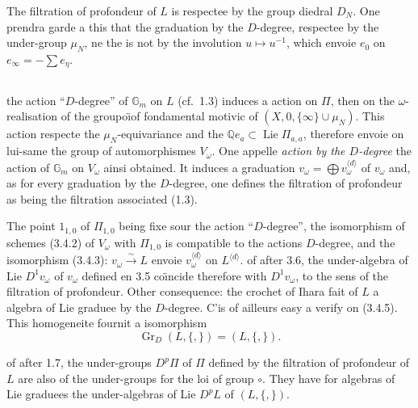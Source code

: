 \documentclass[11pt,a4paper]{article}
\theoremstyle{plain}
\theoremstyle{definition}
\DeclareMathOperator{\Lie}{Lie}
\newcommand{\Di}{D}
\newcommand{\Gm}{\mathbb{G}_m}
\newcommand{\Q}{\mathbb{Q}}
\newcommand{\Gr}{\operatorname{Gr}}
\begin{document}
The filtration of profondeur of $L$ is respectee by the group diedral $\Di_N$. One prendra garde a this that the graduation by the $D$-degree, respectee by the under-group $\mu_N$, ne the is not by the involution $u \mapsto u^{-1}$, which envoie $e_0$ on $e_\infty = -\sum e_\eta$.

\subsection{}
the action ``$D$-degree'' of $\Gm$ on $L$ (cf.~1.3) induces a action on $\Pi$, then on the $\omega$-realisation of the groupo\"{\i}of fondamental motivic of $(X, 0, \{\infty\} \cup \mu_N)$. This action respecte the $\mu_N$-equivariance and the $\Q e_a \subset \Lie \Pi_{a,a}$, therefore envoie on lui-same the group of automorphismes $V_\omega$. One appelle {\em action by the $D$-degree} the action of $\Gm$ on $V_\omega$ ainsi obtained. It induces a graduation $v_\omega = \bigoplus v_\omega^{\langle d \rangle}$ of $v_\omega$ and, as for every graduation by the $D$-degree, one defines the filtration of profondeur as being the filtration associated (1.3).

The point $1_{1,0}$ of $\Pi_{1,0}$ being fixe sour the action ``$D$-degree'', the isomorphism of schemes (3.4.2) of $V_\omega$ with $\Pi_{1,0}$ is compatible to the actions $D$-degree, and the isomorphism (3.4.3): $v_\omega \xrightarrow{\sim} L$ envoie $v_\omega^{\langle d \rangle}$ on $L^{\langle d \rangle}$. of after 3.6, the under-algebra of Lie $D^1v_\omega$ of $v_\omega$ defined en 3.5 co\"{\i}ncide therefore with $D^1v_\omega$, to the sens of the filtration of profondeur. Other consequence: the crochet of Ihara fait of $L$ a algebra of Lie graduee by the $D$-degree. C'is of ailleurs easy a verify on (3.4.5). This homogeneite fournit a isomorphism
\begin{equation}\label{eq:3.8.1}
\Gr_D(L, \{,\}) = (L, \{,\}).
\end{equation}

of after 1.7, the under-groups $D^p\Pi$ of $\Pi$ defined by the filtration of profondeur of $L$ are also of the under-groups for the loi of group $\circ$. They have for algebras of Lie graduees the under-algebras of Lie $D^pL$ of $(L, \{,\})$.
\end{document}
